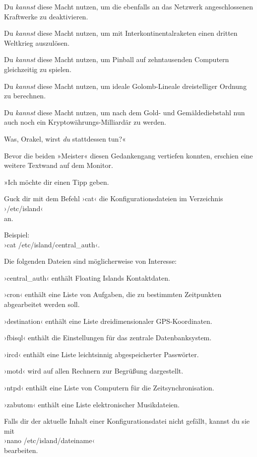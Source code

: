 Du \emph{kannst} diese Macht nutzen, um die ebenfalls an das Netzwerk angeschlossenen Kraftwerke zu deaktivieren.

Du \emph{kannst} diese Macht nutzen, um mit Interkontinentalraketen einen dritten Weltkrieg auszulösen.

Du \emph{kannst} diese Macht nutzen, um Pinball auf zehntausenden Computern gleichzeitig zu spielen.

Du \emph{kannst} diese Macht nutzen, um ideale Golomb-Lineale dreistelliger Ordnung zu berechnen.

Du \emph{kannst} diese Macht nutzen, um nach dem Gold- und Gemäldediebstahl nun auch noch ein Kryptowährungs-Milliardär zu werden.

Was, Orakel, wirst \emph{du} stattdessen tun?«

Bevor die beiden »Meister« diesen Gedankengang vertiefen konnten, erschien eine weitere Textwand auf dem Monitor.

»Ich möchte dir einen Tipp geben.

Guck dir mit dem Befehl ›cat‹ die Konfigurationsdateien im Verzeichnis\\
›/etc/island‹\\
an.

Beispiel:\\
›cat /etc/island/central\_auth‹.

Die folgenden Dateien sind möglicherweise von Interesse:

›central\_auth‹ enthält Floating Islands Kontaktdaten.

›cron‹ enthält eine Liste von Aufgaben, die zu bestimmten Zeitpunkten abgearbeitet werden soll.

›destination‹ enthält eine Liste dreidimensionaler GPS-Koordinaten.

›fbisql‹ enthält die Einstellungen für das zentrale Datenbanksystem.

›ircd‹ enthält eine Liste leichtsinnig abgespeicherter Passwörter.

›motd‹ wird auf allen Rechnern zur Begrüßung dargestellt.

›ntpd‹ enthält eine Liste von Computern für die Zeitsynchronisation.

›zabutom‹ enthält eine Liste elektronischer Musikdateien.

Falls dir der aktuelle Inhalt einer Konfigurationsdatei nicht gefällt, kannst du sie mit\\
›nano /etc/island/dateiname‹\\
bearbeiten.

